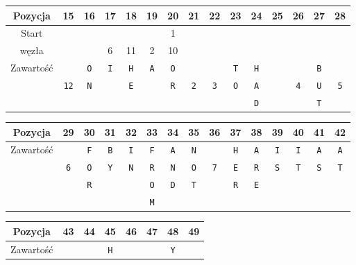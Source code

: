 \begin{table}
\begin{threeparttable}
			{ \small
				\begin{tabularx}{\textwidth}{C{5.4}|C{1.2}|C{1.2}|C{1.2}|C{1.2}|C{1.2}|C{1.2}|C{1.2}|C{1.2}|C{1.2}|C{1.2}|C{1.2}|C{1.2}|C{1.2}|C{1.2}}
					Pozycja & 15 & 16 & 17 & 18 & 19 & 20 & 21 & 22 & 23 & 24 & 25 & 26 & 27 & 28 \\
					\toprule 
					Start & &&&&& 1 &&&&&&&& \\
					węzła & && 6\tnote{W} & 11 & 2 & 10 &&&&&&&& \\
					\hline
					Zawartość && \texttt{O} & \texttt{I} & \texttt{H} & \texttt{A} & \texttt{O} &&& \texttt{T} & \texttt{H} &&& \texttt{B} & \\
					
					& \texttt{12} & \texttt{N} && \texttt{E} && \texttt{R} & \texttt{2\tnote{W}} & \texttt{3} & \texttt{O} & \texttt{A} && \texttt{4} & \texttt{U} & \texttt{5\tnote{W}} \\
					
					&&&&&&&&&& \texttt{D} &&& \texttt{T} & \\
					\hline
					\hline
				\end{tabularx}
			}
			
			{ \small
				\begin{tabularx}{\textwidth}{C{5.4}|C{1.2}|C{1.2}|C{1.2}|C{1.2}|C{1.2}|C{1.2}|C{1.2}|C{1.2}|C{1.2}|C{1.2}|C{1.2}|C{1.2}|C{1.2}|C{1.2}}
					Pozycja & 29 & 30 & 31 & 32 & 33 & 34 & 35 & 36 & 37 & 38 & 39 & 40 & 41 & 42 \\
					\toprule 
					Zawartość & & \texttt{F} & \texttt{B} & \texttt{I} & \texttt{F} & \texttt{A} & \texttt{N} & & \texttt{H} & \texttt{A} & \texttt{I} & \texttt{I} & \texttt{A} & \texttt{A} \\
					
					& \texttt{6} & \texttt{O} & \texttt{Y} & \texttt{N} & \texttt{R} & \texttt{N} & \texttt{O} & \texttt{7} & \texttt{E} & \texttt{R} & \texttt{S} & \texttt{T} & \texttt{S} & \texttt{T} \\
					
					& & \texttt{R} &&& \texttt{O} & \texttt{D} & \texttt{T} & &  \texttt{R} & \texttt{E} &&&& \\
					&&&&& \texttt{M} &&&&&&&&& \\
					\hline
					\hline
				\end{tabularx}
			}
			
			{ \small
				\begin{tabularx}{0.575\textwidth}{C{5.4}|C{1.2}|C{1.2}|C{1.2}|C{1.2}|C{1.2}|C{1.2}|C{1.2}}
					Pozycja & 43 & 44 & 45 & 46 & 47 & 48 & 49 \\
					\toprule 
					Zawartość & & & \texttt{H} & & & \texttt{Y} & \\
					

\end{tabularx}}
\end{threeparttable}
\end{table}
